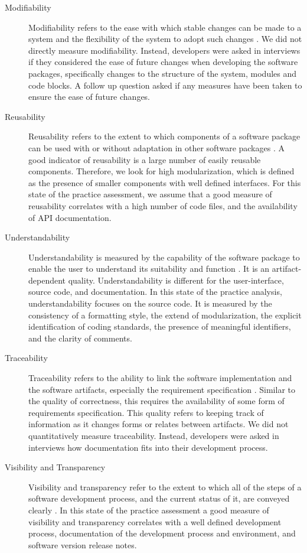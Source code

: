 \documentclass[final, 3p, times, authoryear]{elsarticle}
\begin{document}
\begin{description}
	\item[Modifiability] Modifiability refers to the ease with which stable
	changes can be made to a system and the flexibility of the system to adopt
	such changes \citep{8016712}. We did not directly measure modifiability.
	Instead, developers were asked in interviews if they considered the ease of
	future changes when developing the software packages, specifically changes
	to the structure of the system, modules and code blocks. A follow up
	question asked if any measures have been taken to ensure the ease of future changes.
	
	\item[Reusability] Reusability refers to the extent to which components of a
	software package can be used with or without adaptation in other software
	packages \citep{kalagiakos2003non}. A good indicator of reusability is a
	large number of easily reusable components. Therefore, we look for high
	modularization, which is defined as the presence of smaller components with
	well defined interfaces. For this state of the practice assessment, we
	assume that a good measure of reusability correlates with a high
	number of code files, and the availability of API documentation.
	
	\item[Understandability] Understandability is measured by the capability of
	the software package to enable the user to understand its suitability and
	function \citep{ISO9126}. It is an artifact-dependent quality.
	Understandability is different for the user-interface, source code, and
	documentation. In this state of the practice analysis, understandability
	focuses on the source code. It is measured by the consistency of a
	formatting style, the extend of modularization, the explicit identification
	of coding standards, the presence of meaningful identifiers, and the clarity
	of comments. 
	
	\item[Traceability] Traceability refers to the ability to link the software
	implementation and the software artifacts, especially the requirement
	specification \citep{McCallEtAl1977}. Similar to the quality of correctness,
	this requires the availability of some form of requirements specification.
	This quality refers to keeping track of information as it changes forms or
	relates between artifacts. We did not quantitatively measure traceability.
	Instead, developers were asked in interviews how documentation fits into
	their development process.
	
	\item[Visibility and Transparency] Visibility and transparency refer to the
	extent to which all of the steps of a software development process, and the
	current status of it, are conveyed clearly \citep[p.\ 32]{GhezziEtAl2003}.
	In this state of the practice assessment a good measure of visibility and
	transparency correlates with a well defined development process,
	documentation of the development process and environment, and software
	version release notes.
	

\end{description}
\end{document}
